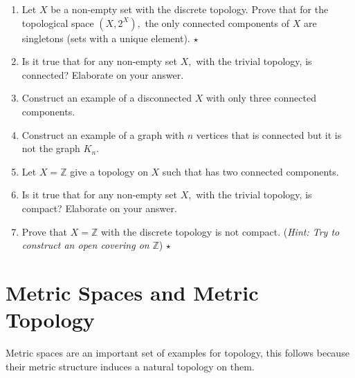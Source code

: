 \documentclass[
	fontsize=10pt, %
	twoside=false, %
	secnumdepth=1, %
]{kaobook}
\begin{document}
\begin{enumerate}

\item Let $X$ be a non-empty set with the discrete topology. Prove that for the topological space $(X,2^X),$ the only connected components of $X$ are singletons (sets with a unique element). $\star$

\item Is it true that for any non-empty set $X,$ with the trivial topology, is connected? Elaborate on your answer. 

\item Construct an example of a disconnected $X$ with only three connected components.

\item Construct an example of a graph with $n$ vertices that is connected but it is not the graph $K_n.$

\item Let $X=\mathbb{Z}$ give a topology on $X$ such that has two connected components. 

\item Is it true that for any non-empty set $X,$ with the trivial topology, is compact? Elaborate on your answer. 

\item Prove that $X=\mathbb{Z}$ with the discrete topology is not compact. (\emph{Hint: Try to construct an open covering on } $\mathbb{Z}$) $\star$
\end{enumerate}

\section{Metric Spaces and Metric Topology}

Metric spaces are an important set of examples for topology, this follows because their metric structure induces a natural topology on them.
\end{document}
